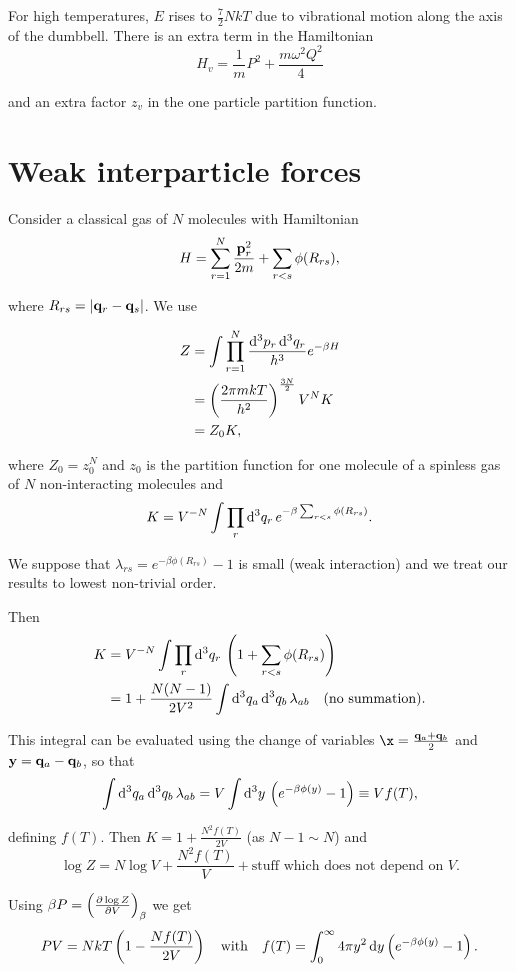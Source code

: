 \documentclass{notes}
\newcommand{\pdf}[3]{\left(\pd{#1}{#2}\right)_{#3}}
\begin{document}
For high temperatures, $E$ rises to $\tfrac{7}{2} N k T$ due to
vibrational motion along the axis of the dumbbell.  There is an extra
term in the Hamiltonian
\[
H_v = \frac{1}{m} P^2 + \frac{m \omega^2 Q^2}{4}
\]

and an extra factor $z_v$ in the one particle partition function.

\section{Weak interparticle forces}

Consider a classical gas of $N$ molecules with Hamiltonian
\[
H = \sum_{r=1}^N \frac{\mathbf{p}_r^2}{2 m}
+ \sum_{r < s} \phi(R_{rs}),
\]

where $R_{rs} = \left|\mathbf{q}_r - \mathbf{q}_s\right|$.  We use

\begin{align*}
Z &= \int \prod_{r=1}^N \frac{\mathrm{d}^3 p_r\, \mathrm{d}^3 q_r}{h^3}
e^{-\beta H} \\
&= \left( \frac{2 \pi m k T}{h^2} \right)^{\frac{3 N}{2}} V^N K \\
&= Z_0 K,
\end{align*}

where $Z_0 = z_0^N$ and $z_0$ is the partition function for one
molecule of a spinless gas of $N$ non-interacting molecules and
\[
K = V^{-N} \int \prod_r \mathrm{d}^3 q_r\, e^{-\beta \sum_{r < s} \phi(R_{rs})}.
\]

We suppose that $\lambda_{rs} = e^{-\beta \phi(R_{rs})} - 1$ is small
(weak interaction) and we treat our results to lowest non-trivial order.

Then
\begin{align*}
K &= V^{-N} \int \prod_r \mathrm{d}^3 q_r\, \left( 1 + \sum_{r < s}
  \phi(R_{rs}) \right) \\
&= 1 + \frac{N(N-1)}{2 V^2} \int \mathrm{d}^3 q_a\, \mathrm{d}^3 q_b\, \lambda_{ab}
  \quad \text{(no summation).}
\end{align*}

This integral can be evaluated using the change of variables $\x =
\frac{\vect{q}_a + \vect{q}_b}{2}$ and $\mathbf{y} = \mathbf{q}_a -
\mathbf{q}_b$, so that
\[
\int \mathrm{d}^3 q_a\, \mathrm{d}^3 q_b\, \lambda_{ab} =
V \int \mathrm{d}^3 y\, \left( e^{-\beta \phi(y)}-1\right)
\equiv V f(T),
\]

defining $f(T)$.  Then $K = 1 + \frac{N^2 f(T)}{2 V}$
(as $N-1 \sim N$) and
\[
\log Z = N \log V + \frac{N^2 f(T)}{V} + \text{stuff which does not
depend on $V$.}
\]

Using $\beta P = \pdf{\log Z}{V}{\beta}$ we get
\begin{equation}\label{eq:interstate}
P V = N k T \left( 1 - \frac{N f(T)}{2 V}\right) \quad \text{with}
\quad f(T) = \int_0^\infty 4 \pi y^2\, \mathrm{d} y  \left( e^{-\beta \phi(y)}
- 1 \right).
\end{equation}
\end{document}
